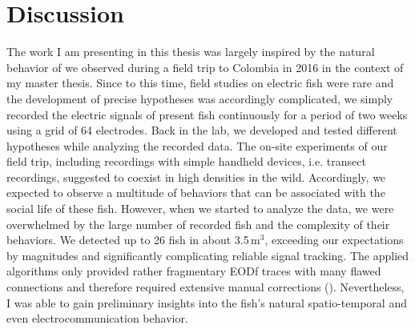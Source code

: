 %
%
%


\chapter{Discussion}

The work I am presenting in this thesis was largely inspired by the natural behavior of \lepto{} we observed during a field trip to Colombia in 2016 in the context of my master thesis. Since to this time, field studies on electric fish were rare and the development of precise hypotheses was accordingly complicated, we simply recorded the electric signals of present fish continuously for a period of two weeks using a grid of 64 electrodes. Back in the lab, we developed and tested different hypotheses while analyzing the recorded data. The on-site experiments of our field trip, including recordings with simple handheld devices, i.e. transect recordings, suggested \lepto{} to coexist in high densities in the wild. Accordingly, we expected to observe a multitude of behaviors that can be associated with the social life of these fish. However, when we started to analyze the data, we were overwhelmed by the large number of recorded fish and the complexity of their behaviors. We detected up to 26 fish in about 3.5\,m$^3$, exceeding our expectations by magnitudes and significantly complicating reliable signal tracking. The applied algorithms only provided rather fragmentary EODf traces with many flawed connections and therefore required extensive manual corrections (). Nevertheless, I was able to gain preliminary insights into the fish's natural spatio-temporal and even electrocommunication behavior.

